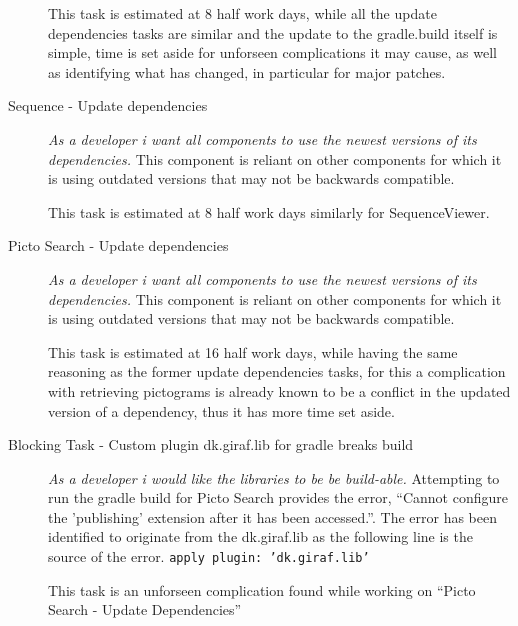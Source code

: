 \begin{description}
        This task is estimated at 8 half work days, while all the update dependencies tasks are similar and the update to the gradle.build itself is simple, time is set aside for unforseen complications it may cause, as well as identifying what has changed, in particular for major patches.
    \item[Sequence - Update dependencies]
        \textit{As a developer i want all components to use the newest versions of its dependencies.}
        This component is reliant on other components for which it is using outdated versions that may not be backwards compatible.

        This task is estimated at 8 half work days similarly for SequenceViewer.
    \item[Picto Search - Update dependencies] 
        \textit{As a developer i want all components to use the newest versions of its dependencies.}
        This component is reliant on other components for which it is using outdated versions that may not be backwards compatible.

        This task is estimated at 16 half work days, while having the same reasoning as the former update dependencies tasks, for this a complication with retrieving pictograms is already known to be a conflict in the updated version of a dependency, thus it has more time set aside.
    \item[Blocking Task - Custom plugin dk.giraf.lib for gradle breaks build]
        \textit{As a developer i would like the libraries to be be build-able.}
        Attempting to run the gradle build for Picto Search provides the error, ``Cannot configure the 'publishing' extension after it has been accessed.''. The error has been identified to originate from the dk.giraf.lib as the following line is the source of the error.
        \texttt{apply plugin: 'dk.giraf.lib'}

        This task is an unforseen complication found while working on ``Picto Search - Update Dependencies''
\end{description}
